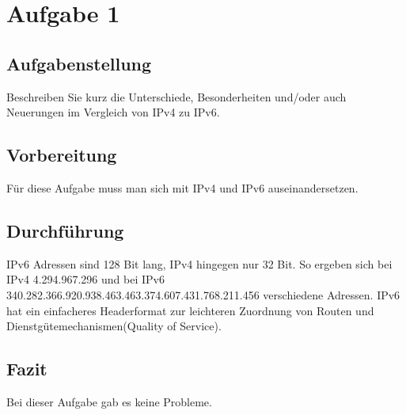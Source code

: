 \newpage

\section{Aufgabe 1}

\subsection{Aufgabenstellung}
Beschreiben Sie kurz die Unterschiede, Besonderheiten und/oder auch Neuerungen im Vergleich von IPv4 zu IPv6.

\subsection{Vorbereitung}
Für diese Aufgabe muss man sich mit IPv4 und IPv6 auseinandersetzen.

\subsection{Durchführung}
IPv6 Adressen sind 128 Bit lang, IPv4 hingegen nur 32 Bit. So ergeben sich bei IPv4 4.294.967.296 und bei IPv6 340.282.366.920.938.463.463.374.607.431.768.211.456 verschiedene Adressen. IPv6 hat ein einfacheres Headerformat zur leichteren Zuordnung von Routen und Dienstgütemechanismen(Quality of Service).

\subsection{Fazit}
Bei dieser Aufgabe gab es keine Probleme.